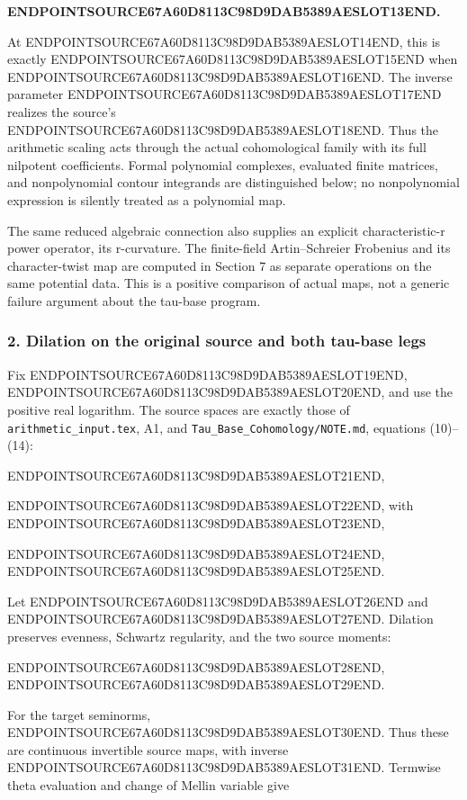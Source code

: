 \textbf{ENDPOINTSOURCE67A60D8113C98D9DAB5389AESLOT13END.}

At ENDPOINTSOURCE67A60D8113C98D9DAB5389AESLOT14END, this is exactly ENDPOINTSOURCE67A60D8113C98D9DAB5389AESLOT15END when ENDPOINTSOURCE67A60D8113C98D9DAB5389AESLOT16END. The inverse parameter ENDPOINTSOURCE67A60D8113C98D9DAB5389AESLOT17END realizes the source's ENDPOINTSOURCE67A60D8113C98D9DAB5389AESLOT18END. Thus the arithmetic scaling acts through the actual cohomological family with its full nilpotent coefficients. Formal polynomial complexes, evaluated finite matrices, and nonpolynomial contour integrands are distinguished below; no nonpolynomial expression is silently treated as a polynomial map.

The same reduced algebraic connection also supplies an explicit characteristic-r power operator, its r-curvature. The finite-field Artin--Schreier Frobenius and its character-twist map are computed in Section 7 as separate operations on the same potential data. This is a positive comparison of actual maps, not a generic failure argument about the tau-base program.

\subsubsection{2. Dilation on the original source and both tau-base legs}\label{endpoint-f1_scaling--dilation-on-the-original-source-and-both-tau-base-legs}

Fix ENDPOINTSOURCE67A60D8113C98D9DAB5389AESLOT19END, ENDPOINTSOURCE67A60D8113C98D9DAB5389AESLOT20END, and use the positive real logarithm. The source spaces are exactly those of \texttt{arithmetic\_input.tex}, A1, and \texttt{Tau\_Base\_Cohomology/NOTE.md}, equations (10)--(14):

ENDPOINTSOURCE67A60D8113C98D9DAB5389AESLOT21END,

ENDPOINTSOURCE67A60D8113C98D9DAB5389AESLOT22END, with ENDPOINTSOURCE67A60D8113C98D9DAB5389AESLOT23END,

ENDPOINTSOURCE67A60D8113C98D9DAB5389AESLOT24END, ENDPOINTSOURCE67A60D8113C98D9DAB5389AESLOT25END.

Let ENDPOINTSOURCE67A60D8113C98D9DAB5389AESLOT26END and ENDPOINTSOURCE67A60D8113C98D9DAB5389AESLOT27END. Dilation preserves evenness, Schwartz regularity, and the two source moments:

ENDPOINTSOURCE67A60D8113C98D9DAB5389AESLOT28END, ENDPOINTSOURCE67A60D8113C98D9DAB5389AESLOT29END.

For the target seminorms, ENDPOINTSOURCE67A60D8113C98D9DAB5389AESLOT30END. Thus these are continuous invertible source maps, with inverse ENDPOINTSOURCE67A60D8113C98D9DAB5389AESLOT31END. Termwise theta evaluation and change of Mellin variable give


